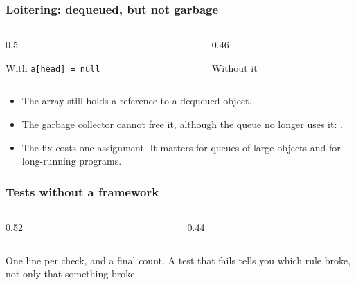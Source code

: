 \documentclass[aspectratio=169,10pt,compress]{beamer}
\begin{document}
\begin{frame}[t,fragile] \frametitle{Loitering: dequeued, but not garbage}
  \begin{columns}[T]
    \begin{column}{0.5\textwidth}
      \begin{block}{With \texttt{a[head] = null}}
      \end{block}
    \end{column}
    \begin{column}{0.46\textwidth}
      \begin{block}{Without it}
      \end{block}
    \end{column}
  \end{columns}
  \vspace{0.4em}
  \begin{itemize}\small
    \item The array still holds a reference to a dequeued object.
    \item The garbage collector cannot free it, although the queue no longer uses it: .
    \item The fix costs one assignment. It matters for queues of large objects and for long-running programs.
  \end{itemize}
\end{frame}





\begin{frame}[t,fragile] \frametitle{Tests without a framework}
  \begin{columns}[T]
    \begin{column}{0.52\textwidth}
    \end{column}
    \begin{column}{0.44\textwidth}
    \end{column}
  \end{columns}
  \small One line per check, and a final count. A test that fails tells you which rule broke, not only that something broke.
\end{frame}
\end{document}
